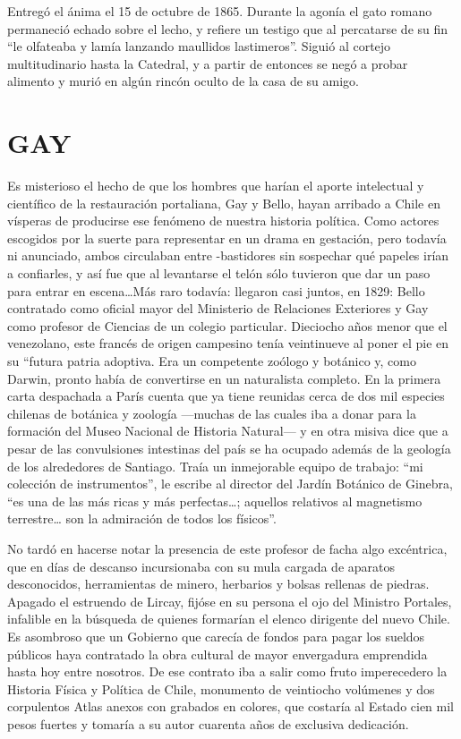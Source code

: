 \documentclass[10pt,twoside,openright]{memoir}
\begin{document}
Entregó el ánima el 15 de octubre de 1865. Durante la agonía el gato
romano permaneció echado sobre el lecho, y refiere un testigo que al
percatarse de su fin ``le olfateaba y lamía lanzando maullidos
lastimeros''. Siguió al cortejo multitudinario hasta la Catedral, y a
partir de entonces se negó a probar alimento y murió en algún rincón
oculto de la casa de su amigo.

\chapter{GAY}

Es misterioso el hecho de que los hombres que harían el aporte
intelectual y científico de la restauración portaliana, Gay y Bello,
hayan arribado a Chile en vísperas de producirse ese fenómeno de nuestra
historia política. Como actores escogidos por la suerte para representar
en un drama en gestación, pero todavía ni anunciado, ambos circulaban
entre -bastidores sin sospechar qué papeles irían a confiarles, y así
fue que al levantarse el telón sólo tuvieron que dar un paso para entrar
en escena\ldots Más raro todavía: llegaron casi juntos, en 1829: Bello
contratado como oficial mayor del Ministerio de Relaciones Exteriores y
Gay como profesor de Ciencias de un colegio particular. Dieciocho años
menor que el venezolano, este francés de origen campesino tenía
veintinueve al poner el pie en su ``futura patria adoptiva. Era un
competente zoólogo y botánico y, como Darwin, pronto había de
convertirse en un naturalista completo. En la primera carta despachada a
París cuenta que ya tiene reunidas cerca de dos mil especies chilenas de
botánica y zoología ---muchas de las cuales iba a donar para la
formación del Museo Nacional de Historia Natural--- y en otra misiva
dice que a pesar de las convulsiones intestinas del país se ha ocupado
además de la geología de los alrededores de Santiago. Traía un
inmejorable equipo de trabajo: ``mi colección de instrumentos'', le
escribe al director del Jardín Botánico de Ginebra, ``es una de las más
ricas y más perfectas\ldots; aquellos relativos al magnetismo terrestre\ldots
son la admiración de todos los físicos''.

No tardó en hacerse notar la presencia de este profesor de facha algo
excéntrica, que en días de descanso incursionaba con su mula cargada de
aparatos desconocidos, herramientas de minero, herbarios y bolsas
rellenas de piedras. Apagado el estruendo de Lircay, fijóse en su
persona el ojo del Ministro Portales, infalible en la búsqueda de
quienes formarían el elenco dirigente del nuevo Chile. Es asombroso que
un Gobierno que carecía de fondos para pagar los sueldos públicos haya
contratado la obra cultural de mayor envergadura emprendida hasta hoy
entre nosotros. De ese contrato iba a salir como fruto imperecedero la
Historia Física y Política de Chile, monumento de veintiocho volúmenes y
dos corpulentos Atlas anexos con grabados en colores, que costaría al
Estado cien mil pesos fuertes y tomaría a su autor cuarenta años de
exclusiva dedicación.
\end{document}
